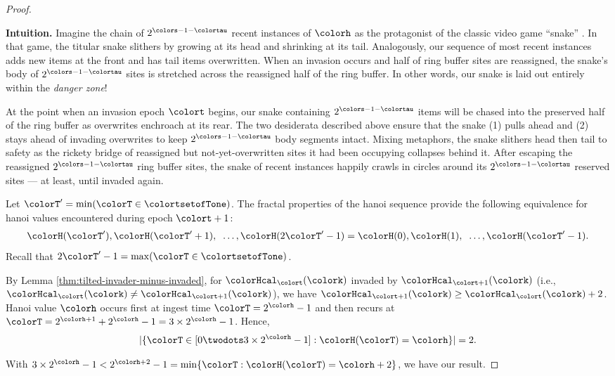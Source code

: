 \begin{proof}
\begin{mybox}
\textbf{Intuition.}
Imagine the chain of $2^{\colors - 1 - \colortau}$ recent instances of \hv{} $\colorh$ as the protagonist of the classic video game ``snake'' \citep{de2016complexity}.
In that game, the titular snake slithers by growing at its head and shrinking at its tail.
Analogously, our sequence of most recent \hv{} instances adds new items at the front and has tail items overwritten.
When an invasion occurs and half of ring buffer sites are reassigned, the snake's body of $2^{\colors - 1 - \colortau}$ sites is stretched across the reassigned half of the ring buffer.
In other words, our snake is laid out entirely within the \textit{danger zone}!

At the point when an invasion epoch $\colort$ begins, our snake containing $2^{\colors - 1 - \colortau}$ items will be chased into the preserved half of the ring buffer as overwrites enchroach at its rear.
The two desiderata described above ensure that the snake (1) pulls ahead and (2) stays ahead of invading overwrites to keep $2^{\colors - 1 - \colortau}$ body segments intact.
Mixing metaphors, the snake slithers head then tail to safety as the rickety bridge of reassigned but not-yet-overwritten sites it had been occupying collapses behind it.
After escaping the reassigned $2^{\colors - 1 - \colortau}$ ring buffer sites, the snake of recent \hv{} instances happily crawls in circles around its $2^{\colors - 1 - \colortau}$ reserved sites --- at least, until invaded again.
\end{mybox}

\begin{proofpart}
Let $\colorT' = \min(\colorT \in \colortsetofTone)$.
The fractal properties of the hanoi sequence provide the following equivalence for hanoi values encountered during epoch $\colort + 1$:
\begin{align*}
\colorH(\colorT'), \colorH(\colorT'+1), \;\;\ldots, \colorH(2\colorT' - 1) = \colorH(0), \colorH(1), \;\;\ldots, \colorH(\colorT' - 1).
\end{align*}
Recall that $2\colorT' - 1 = \max(\colorT \in \colortsetofTone)$.

By Lemma \ref{thm:tilted-invader-minus-invaded}, for \hv{} $\colorHcal_{\colort}(\colork)$ invaded by \hv{} $\colorHcal_{\colort + 1}(\colork)$ (i.e., $\colorHcal_{\colort}(\colork) \neq \colorHcal_{\colort + 1}(\colork)$), we have $\colorHcal_{\colort + 1}(\colork) \geq \colorHcal_{\colort}(\colork) + 2$.
Hanoi value $\colorh$ occurs first at ingest time $\colorT = 2^{\colorh} - 1$ and then recurs at $\colorT = 2^{\colorh + 1} + 2^{\colorh} - 1 = 3 \times 2^{\colorh} - 1$.
Hence,
\begin{align*}
|\{\colorT \in [0 \twodots 3 \times 2^{\colorh} - 1] : \colorH(\colorT) = \colorh\}| = 2.
\end{align*}
\end{proofpart}
With $3 \times 2^{\colorh} - 1 < 2^{\colorh + 2} - 1 = \min\{\colorT : \colorH(\colorT) = \colorh + 2\}$, we have our result.


\end{proof}
